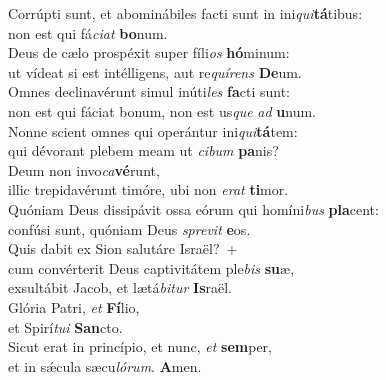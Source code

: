 \evenverse Corrúpti sunt, et abominábiles facti sunt in ini\textit{qui}\textbf{tá}tibus:~\*\\
\evenverse non est qui fá\textit{ci}\textit{at} \textbf{bo}num.\\
\oddverse Deus de cælo prospéxit super fíli\textit{os} \textbf{hó}minum:~\*\\
\oddverse ut vídeat si est intélligens, aut re\textit{quí}\textit{rens} \textbf{De}um.\\
\evenverse Omnes declinavérunt simul inúti\textit{les} \textbf{fa}cti sunt:~\*\\
\evenverse non est qui fáciat bonum, non est us\textit{que} \textit{ad} \textbf{u}num.\\
\oddverse Nonne scient omnes qui operántur ini\textit{qui}\textbf{tá}tem:~\*\\
\oddverse qui dévorant plebem meam ut \textit{ci}\textit{bum} \textbf{pa}nis?\\
\evenverse Deum non invo\textit{ca}\textbf{vé}runt,~\*\\
\evenverse illic trepidavérunt timóre, ubi non \textit{e}\textit{rat} \textbf{ti}mor.\\
\oddverse Quóniam Deus dissipávit ossa eórum qui homíni\textit{bus} \textbf{pla}cent:~\*\\
\oddverse confúsi sunt, quóniam Deus \textit{spre}\textit{vit} \textbf{e}os.\\
\evenverse Quis dabit ex Sion salutáre Israël?~+\\
\evenverse  cum convérterit Deus captivitátem ple\textit{bis} \textbf{su}æ,~\*\\
\evenverse exsultábit Jacob, et lætá\textit{bi}\textit{tur} \textbf{Is}raël.\\
\oddverse Glória Patri, \textit{et} \textbf{Fí}lio,~\*\\
\oddverse et Spirí\textit{tu}\textit{i} \textbf{San}cto.\\
\evenverse Sicut erat in princípio, et nunc, \textit{et} \textbf{sem}per,~\*\\
\evenverse et in sǽcula sæcu\textit{ló}\textit{rum}. \textbf{A}men.\\
